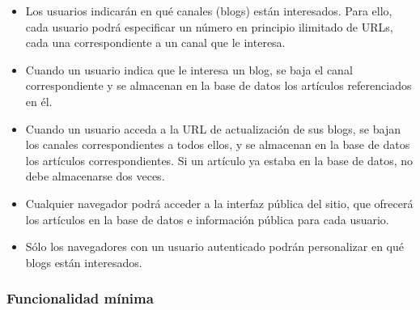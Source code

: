 \begin{itemize}
\item Los usuarios indicarán en qué canales (blogs) están interesados. Para ello, cada usuario podrá especificar un número en principio ilimitado de URLs, cada una correspondiente a un canal que le interesa.
\item Cuando un usuario indica que le interesa un blog, se baja el canal correspondiente y se almacenan en la base de datos los artículos referenciados en él.
\item Cuando un usuario acceda a la URL de actualización de sus blogs, se bajan los canales correspondientes a todos ellos, y se almacenan en la base de datos los artículos correspondientes. Si un artículo ya estaba en la base de datos, no debe almacenarse dos veces.
\item Cualquier navegador podrá acceder a la interfaz pública del sitio, que ofrecerá los artículos en la base de datos e información pública para cada usuario.
\item Sólo los navegadores con un usuario autenticado podrán personalizar en qué blogs están interesados.
\end{itemize}

\subsubsection{Funcionalidad mínima}

